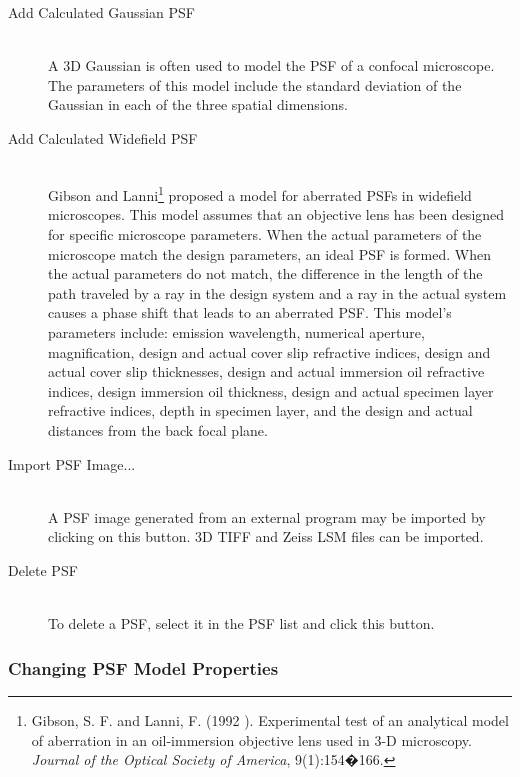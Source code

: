 \documentclass[11pt,titlepage,twoside]{article}
\begin{document}
\begin{description}

\item[Add Calculated Gaussian PSF] \hfill \\
A 3D Gaussian is often used to model the PSF of a confocal microscope. The parameters of this model include the standard deviation of the Gaussian in each of the three spatial dimensions.

\item[Add Calculated Widefield PSF] \hfill \\
Gibson and Lanni\footnote{Gibson, S. F. and Lanni, F. (1992 ). Experimental test of an analytical model of aberration in an oil-immersion objective lens used in 3-D microscopy. \emph{Journal of the Optical Society of America}, 9(1):154�166.} proposed a model for aberrated PSFs in widefield microscopes. This model assumes that an objective lens has been designed for specific microscope parameters. When the actual parameters of the microscope match the design parameters, an ideal PSF is formed. When the actual parameters do not match, the difference in the length of the path traveled by a ray in the design system and a ray in the actual system causes a phase shift that leads to an aberrated PSF. This model's parameters include: emission wavelength, numerical aperture, magnification, design and actual cover slip refractive indices, design and actual cover slip thicknesses, design and actual immersion oil refractive indices, design immersion oil thickness, design and actual specimen layer refractive indices, depth in specimen layer, and the design and actual distances from the back focal plane.

\item[Import PSF Image...] \hfill \\
A PSF image generated from an external program may be imported by clicking on this button. 3D TIFF and Zeiss LSM files can be imported.

\item[Delete PSF] \hfill \\
To delete a PSF, select it in the PSF list and click this button.

\end{description}

\subsubsection{Changing PSF Model Properties}
\label{sec:ChangingPSFModelProperties}
\end{document}
